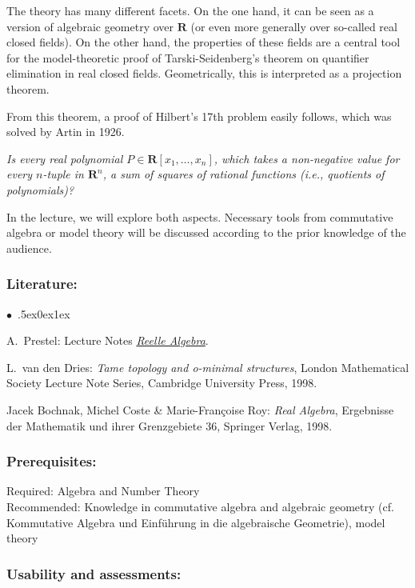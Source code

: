 \documentclass[a4paper,10pt]{article}
\renewenvironment{itemize}{\begin{list}{$\bullet$\ }{\itemsep.5ex\setlength{\topsep}{0.5\itemsep}\parsep0ex\labelsep1ex\settowidth{\labelwidth}{$\bullet$\ }\setlength{\leftmargin}{\labelwidth}\addtolength{\leftmargin}{3ex}\addtolength{\leftmargin}{\labelsep}}}{\end{list}}
\begin{document}
The theory has many different facets. On the one hand, it can be seen as a version of algebraic geometry over $\mathbf{R}$ (or even more generally over so-called real closed fields). On the other hand, the properties of these fields are a central tool for the model-theoretic proof of Tarski-Seidenberg's theorem on quantifier elimination in real closed fields. Geometrically, this is interpreted as a projection theorem.

From this theorem, a proof of Hilbert's 17th problem easily follows, which was solved by Artin in 1926.

\textit{Is every real polynomial $P \in \mathbf{R}[x_1, \dots, x_n]$, which takes a non-negative value for every $n$-tuple in $\mathbf{R}^n$, a sum of squares of rational functions (i.e., quotients of polynomials)?}

In the lecture, we will explore both aspects. Necessary tools from commutative algebra or model theory will be discussed according to the prior knowledge of the audience.
\subsubsection*{\large
    Literature:
}
\begin{itemize}
\item A.~Prestel: Lecture Notes \href{http://www.math.uni-konstanz.de/\~prestel/raskript.pdf}{\emph{Reelle Algebra}}.
\item
L.~van den Dries: \emph{Tame topology and o-minimal structures}, London Mathematical Society Lecture Note Series, Cambridge University Press, 1998. 
\item
Jacek Bochnak, Michel Coste \& Marie-Françoise Roy: \emph{Real Algebra}, Ergebnisse der Mathematik und ihrer Grenzgebiete 36, Springer Verlag, 1998.
\end{itemize}
\subsubsection*{\large
    Prerequisites:
}
Required: Algebra and Number Theory \\ 
Recommended: Knowledge in commutative algebra and algebraic geometry (cf. Kommutative Algebra und Einführung in die algebraische Geometrie), model theory
\cleardoublepage
\subsubsection*{\large
    Usability and assessments:
}
\end{document}
